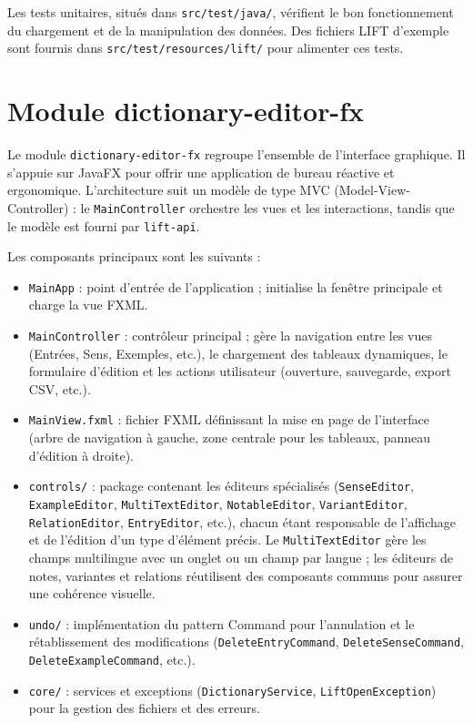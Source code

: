 \documentclass[11pt,twoside,openany]{book}
\begin{document}
Les tests unitaires, situés dans \texttt{src/test/java/}, vérifient le bon fonctionnement du chargement et de la manipulation des données. Des fichiers LIFT d'exemple sont fournis dans \texttt{src/test/resources/lift/} pour alimenter ces tests.

\section{Module dictionary-editor-fx}

Le module \texttt{dictionary-editor-fx} regroupe l'ensemble de l'interface graphique. Il s'appuie sur JavaFX pour offrir une application de bureau réactive et ergonomique. L'architecture suit un modèle de type MVC (Model-View-Controller) : le \texttt{MainController} orchestre les vues et les interactions, tandis que le modèle est fourni par \texttt{lift-api}.

Les composants principaux sont les suivants :

\begin{itemize}
\item \texttt{MainApp} : point d'entrée de l'application ; initialise la fenêtre principale et charge la vue FXML.
\item \texttt{MainController} : contrôleur principal ; gère la navigation entre les vues (Entrées, Sens, Exemples, etc.), le chargement des tableaux dynamiques, le formulaire d'édition et les actions utilisateur (ouverture, sauvegarde, export CSV, etc.).
\item \texttt{MainView.fxml} : fichier FXML définissant la mise en page de l'interface (arbre de navigation à gauche, zone centrale pour les tableaux, panneau d'édition à droite).
\item \texttt{controls/} : package contenant les éditeurs spécialisés (\texttt{SenseEditor}, \texttt{ExampleEditor}, \texttt{MultiTextEditor}, \texttt{NotableEditor}, \texttt{VariantEditor}, \texttt{RelationEditor}, \texttt{EntryEditor}, etc.), chacun étant responsable de l'affichage et de l'édition d'un type d'élément précis. Le \texttt{MultiTextEditor} gère les champs multilingue avec un onglet ou un champ par langue ; les éditeurs de notes, variantes et relations réutilisent des composants communs pour assurer une cohérence visuelle.
\item \texttt{undo/} : implémentation du pattern Command pour l'annulation et le rétablissement des modifications (\texttt{DeleteEntryCommand}, \texttt{DeleteSenseCommand}, \texttt{DeleteExampleCommand}, etc.).
\item \texttt{core/} : services et exceptions (\texttt{DictionaryService}, \texttt{LiftOpenException}) pour la gestion des fichiers et des erreurs.
\end{itemize}
\end{document}
